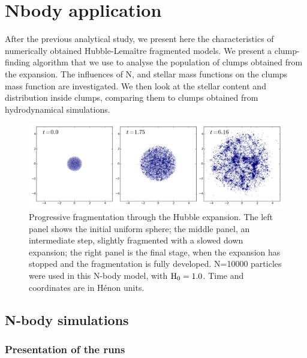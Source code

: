 

\chapter{Nbody application}
\label{Chap:nbody}

After the previous analytical study, we present here the characteristics of  numerically obtained Hubble-Lema\^itre fragmented models. We present a clump-finding algorithm that we use to analyse the population of clumps obtained from the expansion. The influences of N, \tHub and stellar mass functions on the clumps mass function are investigated. We then look at the stellar content and distribution inside clumps, comparing them to clumps obtained from hydrodynamical simulations.


\minitoc



\begin{figure}
\begin{center}
\includegraphics[width=\textwidth]{Figures/2_fragmentation}
\caption{Progressive fragmentation through the Hubble expansion. The left panel shows the initial uniform sphere; the middle panel, an intermediate step, slightly fragmented with a slowed down expansion; the right panel is the final stage, when the expansion has stopped and the fragmentation is fully developed. N=10000 particles were used in this N-body model, with ${\textrm{H}}_0 = 1.0$. Time and coordinates are in H\'enon units.}
\label{Fig:2_fragmentation}
\end{center}
\end{figure}

\section{N-body simulations}




\subsection{Presentation of the runs}

